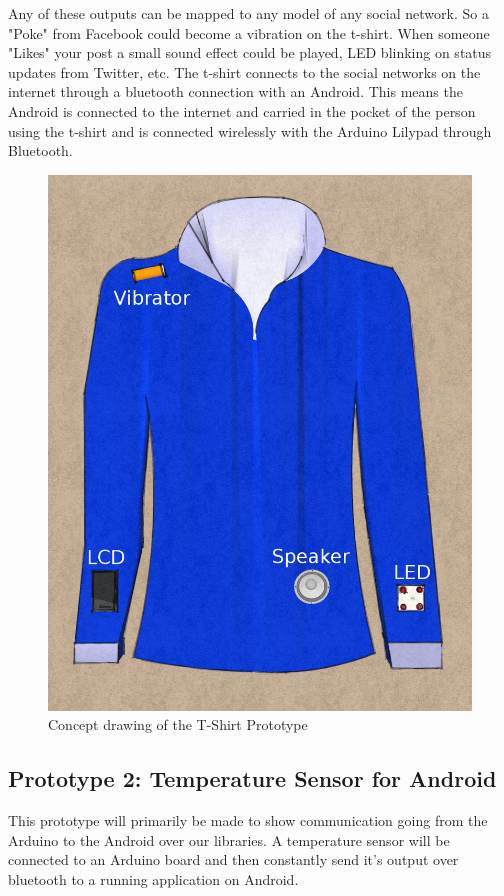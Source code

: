 Any of these outputs can be mapped to any model of any social network. So a "Poke" from Facebook could become a
vibration on the t-shirt. When someone "Likes" your post a small sound effect could be played, LED blinking on
status updates from Twitter, etc. The t-shirt connects to the social networks on the internet through a bluetooth
connection with an Android. This means the Android is connected to the internet and carried in the pocket of the
person using the t-shirt and is connected wirelessly with the Arduino Lilypad through Bluetooth.

\begin{figure}[h!]
\centering \includegraphics[scale=0.4]{img/testing-tshirtproto} \caption{Concept drawing of the T-Shirt Prototype}

\label{fig:testing-TShirt}
\end{figure}

\subsection{Prototype 2: Temperature Sensor for Android}
This prototype will primarily be made to show communication going from the Arduino to the Android over our libraries. 
A temperature sensor will be connected to an Arduino board and then constantly send it's output over bluetooth to a 
running application on Android. 

